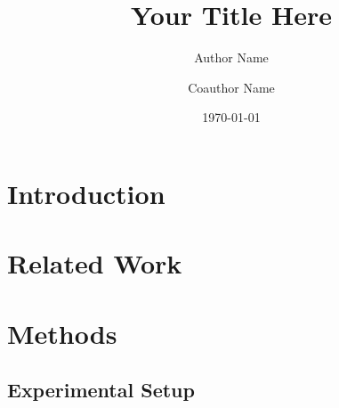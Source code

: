 \documentclass[11pt]{article}
\title{Your Title Here}
\author{Author Name \and Coauthor Name}
\date{\today}
\begin{document}
\maketitle

\begin{abstract}
\end{abstract}


\section{Introduction}
\label{sec:introduction}






\section{Related Work}
\label{sec:related}


\section{Methods}
\label{sec:methods}



\subsection{Experimental Setup}
\label{sec:setup}
\end{document}
